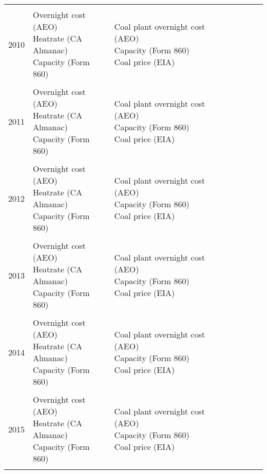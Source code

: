 \documentclass[10pt]{report}
\begin{document}
\begin{scriptsize}
\begin{landscape}
\begin{center}
\begin{longtable}{|lllllllll|}
\hline \\
2010 & \shortstack{Overnight cost (AEO) \\ Heatrate (CA Almanac) \\ Capacity (Form 860)} &
\shortstack{Coal plant overnight cost (AEO) \\ Capacity (Form 860) \\ Coal price (EIA)} & \\
\hline \\
2011 & \shortstack{Overnight cost (AEO) \\ Heatrate (CA Almanac) \\ Capacity (Form 860)} &
\shortstack{Coal plant overnight cost (AEO) \\ Capacity (Form 860) \\ Coal price (EIA)} & \\
\hline \\
2012 & \shortstack{Overnight cost (AEO) \\ Heatrate (CA Almanac) \\ Capacity (Form 860)} &
\shortstack{Coal plant overnight cost (AEO) \\ Capacity (Form 860) \\ Coal price (EIA)} & \\
\hline \\
2013 & \shortstack{Overnight cost (AEO) \\ Heatrate (CA Almanac) \\ Capacity (Form 860)} &
\shortstack{Coal plant overnight cost (AEO) \\ Capacity (Form 860) \\ Coal price (EIA)} & \\
\hline \\
2014 & \shortstack{Overnight cost (AEO) \\ Heatrate (CA Almanac) \\ Capacity (Form 860)} &
\shortstack{Coal plant overnight cost (AEO) \\ Capacity (Form 860) \\ Coal price (EIA)} & \\
\hline \\
2015 & \shortstack{Overnight cost (AEO) \\ Heatrate (CA Almanac) \\ Capacity (Form 860)} &
\shortstack{Coal plant overnight cost (AEO) \\ Capacity (Form 860) \\ Coal price (EIA)} & \\
\\

\hline 
\end{longtable}
\end{center}
\end{landscape}
\end{scriptsize}
\endgroup
\newpage
\restoregeometry
\end{document}
